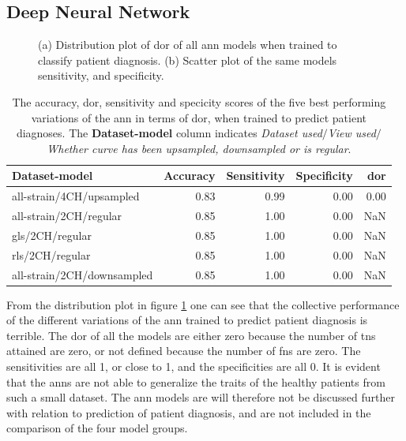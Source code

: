 \newpage

\subsection{Deep Neural Network}

\begin{figure}[H]
    \centering
    
    \caption{(a) Distribution plot of \acrshort{dor} of all \acrshort{ann} models when trained to classify patient diagnosis.
             (b) Scatter plot of the same models sensitivity, and specificity.}
    \label{fig:dl_ind_dor_sens_spec_dist}
\end{figure}

\begin{table}
    \centering
    \begin{tabular}{lrrrr}
        \toprule
        Dataset-model              &  Accuracy &  Sensitivity &  Specificity &  \acrshort{dor} \\
        \midrule
        all-strain/4CH/upsampled   &      0.83 &         0.99 &         0.00 & 0.00 \\
        all-strain/2CH/regular     &      0.85 &         1.00 &         0.00 &  NaN \\
        gls/2CH/regular            &      0.85 &         1.00 &         0.00 &  NaN \\
        rls/2CH/regular            &      0.85 &         1.00 &         0.00 &  NaN \\
        all-strain/2CH/downsampled &      0.85 &         1.00 &         0.00 &  NaN \\
        \bottomrule
    \end{tabular}
    \caption{The accuracy, \acrshort{dor}, sensitivity and specicity scores of the five best performing variations of the \acrshort{ann} in terms of \acrshort{dor}, when trained to predict patient diagnoses.
             The \textbf{Dataset-model} column indicates \textit{Dataset used}$/$\textit{View used}$/$\textit{Whether curve has been upsampled, downsampled or is regular}.}
    \label{tab:dl_hf_dor_sens_spec_dist}
\end{table}

From the distribution plot in figure \ref{fig:dl_ind_dor_sens_spec_dist} one can see that the collective performance of the different variations of the \acrshort{ann} trained to predict patient diagnosis
is terrible.
The \acrshort{dor} of all the models are either zero because the number of \acrshort{tn}s attained are zero, or not defined because the number of \acrshort{fn}s are zero. 
The sensitivities are all 1, or close to 1, and the specificities are all 0. 
It is evident that the \acrshort{ann}s are not able to generalize the traits of the healthy patients from such a small dataset. 
The \acrshort{ann} models are will therefore not be discussed further with relation to prediction of patient diagnosis, and are not included in the comparison of the four model groups.

